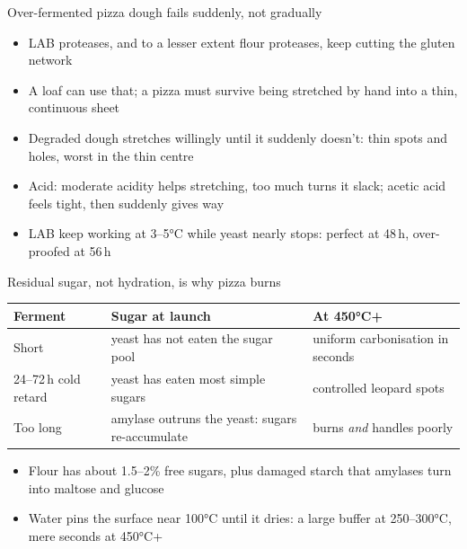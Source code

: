 \documentclass[aspectratio=169,11pt]{beamer}
\newcommand{\tablefont}{\footnotesize\renewcommand{\arraystretch}{1.15}}
\begin{document}
\begin{frame}{Over-fermented pizza dough fails suddenly, not gradually}
  \small
  \begin{itemize}\setlength{\itemsep}{0.3em}
    \item LAB proteases, and to a lesser extent flour proteases, keep
      cutting the gluten network
    \item A loaf can use that; a pizza must survive being stretched by hand
      into a thin, continuous sheet
    \item Degraded dough stretches willingly until it suddenly doesn't: thin
      spots and holes, worst in the thin centre
    \item Acid: moderate acidity helps stretching, too much turns it slack;
      acetic acid feels tight, then suddenly gives way
    \item LAB keep working at 3--5°C while yeast nearly stops: perfect at
      48\,h, over-proofed at 56\,h
  \end{itemize}
\end{frame}

\begin{frame}{Residual sugar, not hydration, is why pizza burns}
  \begingroup\tablefont
  \begin{tabularx}{\linewidth}{@{}l Y Y@{}}
    \toprule
    \textbf{Ferment} & \textbf{Sugar at launch} & \textbf{At 450°C+} \\
    \midrule
    Short & yeast has not eaten the sugar pool & uniform carbonisation in
      seconds \\
    24--72\,h cold retard & yeast has eaten most simple sugars & controlled
      leopard spots \\
    Too long & amylase outruns the yeast: sugars re-accumulate &
      burns \emph{and} handles poorly \\
    \bottomrule
  \end{tabularx}\endgroup
  \small
  \begin{itemize}\setlength{\itemsep}{0.1em}
    \item Flour has about 1.5--2\% free sugars, plus damaged starch that
      amylases turn into maltose and glucose
    \item Water pins the surface near 100°C until it dries: a large buffer
      at 250--300°C, mere seconds at 450°C+
  \end{itemize}
\end{frame}
\end{document}
